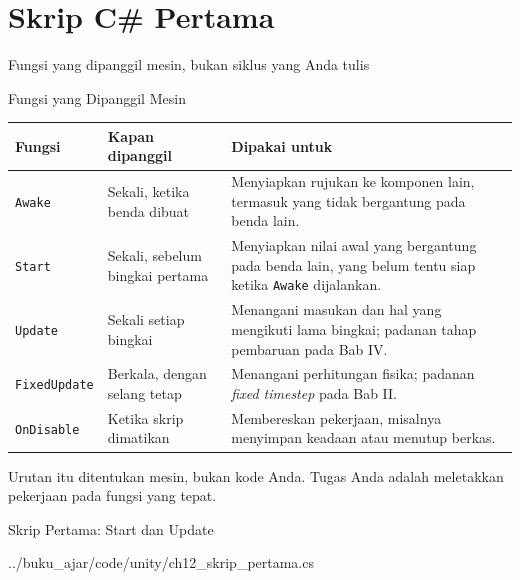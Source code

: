 \documentclass[aspectratio=169,10pt]{beamer}
\begin{document}
\section{Skrip C\# Pertama}
  {Fungsi yang dipanggil mesin, bukan siklus yang Anda tulis}

\begin{frame}{Fungsi yang Dipanggil Mesin}
{\scriptsize
\renewcommand{\arraystretch}{1.08}
\begin{tabularx}{\textwidth}{@{}>{\raggedright\arraybackslash}p{2.3cm}
    >{\raggedright\arraybackslash}p{3.5cm}
    >{\raggedright\arraybackslash}X@{}}
\toprule
\textbf{Fungsi} & \textbf{Kapan dipanggil} & \textbf{Dipakai untuk} \\
\midrule
\texttt{Awake} & Sekali, ketika benda dibuat &
  Menyiapkan rujukan ke komponen lain, termasuk yang tidak bergantung pada
  benda lain. \\
\addlinespace
\texttt{Start} & Sekali, sebelum bingkai pertama &
  Menyiapkan nilai awal yang bergantung pada benda lain, yang belum tentu siap
  ketika \texttt{Awake} dijalankan. \\
\addlinespace
\texttt{Update} & Sekali setiap bingkai &
  Menangani masukan dan hal yang mengikuti lama bingkai; padanan tahap
  pembaruan pada Bab IV. \\
\addlinespace
\texttt{FixedUpdate} & Berkala, dengan selang tetap &
  Menangani perhitungan fisika; padanan \emph{fixed timestep} pada Bab II. \\
\addlinespace
\texttt{OnDisable} & Ketika skrip dimatikan &
  Membereskan pekerjaan, misalnya menyimpan keadaan atau menutup berkas. \\
\bottomrule
\end{tabularx}}
\vspace{0.10cm}
{\footnotesize\color{ubMuted}Urutan itu ditentukan mesin, bukan kode Anda. Tugas
Anda adalah meletakkan pekerjaan pada fungsi yang tepat.}
\end{frame}

\begin{frame}[fragile]{Skrip Pertama: Start dan Update}

  {../buku_ajar/code/unity/ch12_skrip_pertama.cs}
\end{frame}
\end{document}
